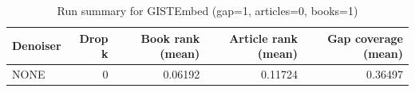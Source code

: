 \begin{table}
\caption{Run summary for GISTEmbed (gap=1, articles=0, books=1)}
\label{tab:summary_gap1_gistembed_a0_b1}
\begin{tabular}{lrrrr}
\toprule
Denoiser & Drop k & Book rank (mean) & Article rank (mean) & Gap coverage (mean) \\
\midrule
NONE & 0 & 0.06192 & 0.11724 & 0.36497 \\
\bottomrule
\end{tabular}
\end{table}